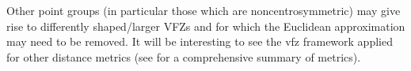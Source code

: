 \documentclass[final,twocolumn,12pt]{elsarticle}
\begin{document}
	Other point groups (in particular those which are noncentrosymmetric) may give rise to differently shaped/larger VFZs and for which the Euclidean approximation may need to be removed. It will be interesting to see the \gls{vfz} framework applied for other distance metrics (see \citet{morawiecDistancesGrainInterfaces2019} for a comprehensive summary of metrics).
\end{document}
